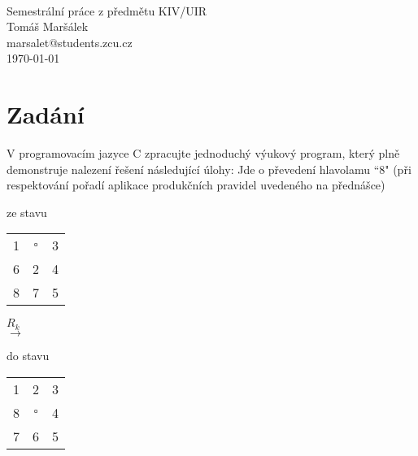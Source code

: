 \documentclass[12pt]{article}
\begin{document}
\begin{titlepage}
\begin{center}
	\mbox{} \\[3cm]
	\huge{Semestrální práce z předmětu KIV/UIR} \\[2.5cm]
	\Large{Tomáš Maršálek} \\
	\large{marsalet@students.zcu.cz} \\[1cm]
	\normalsize{\today}
\end{center}
\thispagestyle{empty}
\end{titlepage}

\section{Zadání}
V programovacím jazyce C zpracujte jednoduchý výukový program, který plně
demonstruje nalezení řešení následující úlohy: Jde o převedení hlavolamu ``8"
(při respektování pořadí aplikace produkčních pravidel uvedeného na přednášce)

\vspace{.3cm}

\begin{center}
\begin{minipage}[b]{.3\textwidth}
\centering
ze stavu \\
\vspace{.1cm}
\begin{LARGE}
\begin{tabular}{|ccc|}
\hline
1 &  $\square$ & 3 \\
6 & 2 & 4 \\
8 & 7 & 5 \\
\hline
\end{tabular}
\end{LARGE}
\end{minipage}
\begin{minipage}[b]{.2\textwidth}
{\large $R_k$} \\
$\longrightarrow$
\end{minipage}
\begin{minipage}[b]{.3\textwidth}
\centering
do stavu \\
\vspace{.1cm}
\begin{LARGE}
\begin{tabular}{|ccc|}
\hline
1 & 2 & 3 \\
8 & $\square$ & 4 \\
7 & 6 & 5 \\
\hline
\end{tabular}
\end{LARGE}
\end{minipage}
\end{center}
\end{document}
